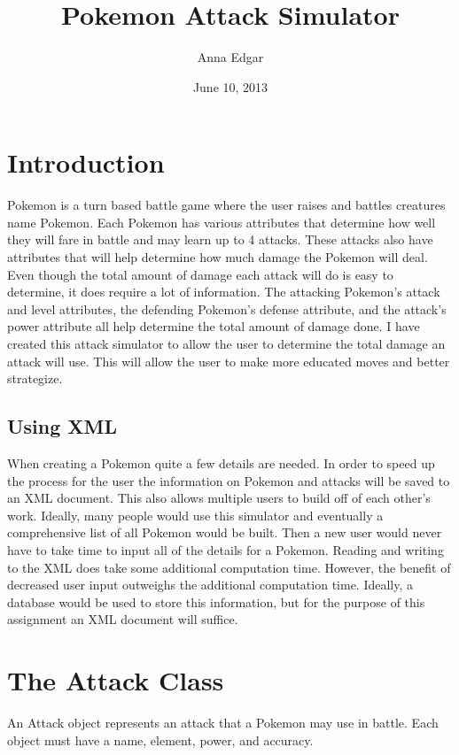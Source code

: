 \documentclass{article}
\title{Pokemon Attack Simulator}
\author{Anna Edgar}
\date{June 10, 2013}
\begin{document}
        \maketitle
        \section{Introduction}
        Pokemon is a turn based battle game where the user raises and battles creatures name Pokemon. Each Pokemon has various attributes that determine how well they will fare in battle and may learn up to 4 attacks. These attacks also have attributes that will help determine how much damage the Pokemon will deal. Even though the total amount of damage each attack will do is easy to determine, it does require a lot of information. The attacking Pokemon's attack and level attributes, the defending Pokemon's defense attribute, and the attack's power attribute all help determine the total amount of damage done. I have created this attack simulator to allow the user to determine the total damage an attack will use. This will allow the user to make more educated moves and better strategize.
        \subsection{Using XML}
        When creating a Pokemon quite a few details are needed. In order to speed up the process for the user the information on Pokemon and attacks will be saved to an XML document. This also allows multiple users to build off of each other's work. Ideally, many people would use this simulator and eventually a comprehensive list of all Pokemon would be built. Then a new user would never have to take time to input all of the details for a Pokemon. Reading and writing to the XML does take some additional computation time. However, the benefit of decreased user input outweighs the additional computation time. Ideally, a database would be used to store this information, but for the purpose of this assignment an XML document will suffice.
        \section{The Attack Class}
        An Attack object represents an attack that a Pokemon may use in battle. Each object must have a name, element, power, and accuracy.
\end{document}
